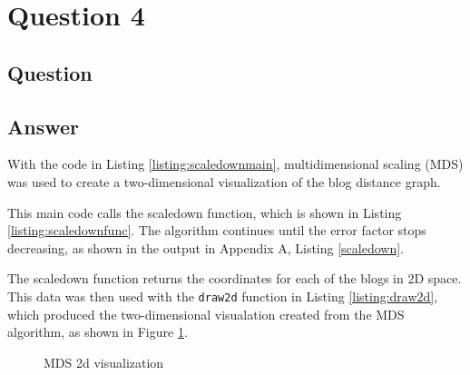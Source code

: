 \section{Question 4}

\subsection{Question}


\subsection{Answer}

With the code in Listing \ref{listing:scaledownmain}, multidimensional scaling (MDS) was used to create a two-dimensional visualization of the blog distance graph.



This main code calls the scaledown function, which is shown in Listing \ref{listing:scaledownfunc}. The algorithm continues until the error factor stops decreasing, as shown in the output in Appendix A, Listing \ref{scaledown}. 



The scaledown function returns the coordinates for each of the blogs in 2D space. This data was then used with the {\tt draw2d} function in Listing \ref{listing:draw2d}, which produced the two-dimensional visualation created from the MDS algorithm, as shown in Figure \ref{fig:blogs2d}.



\begin{figure}[h!]
\centering
{}
\caption{MDS 2d visualization}
\label{fig:blogs2d}
\end{figure}